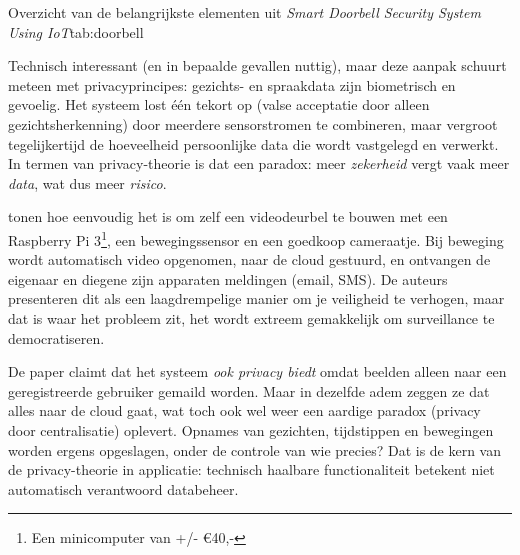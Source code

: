 \documentclass[nonacm, sigconf, balance=true]{acmart}
\begin{document}
    \begin{SimpleTable}[s{0.5}s{1.5}]{Overzicht van de belangrijkste elementen uit \textit{Smart Doorbell Security System Using IoT}}{tab:doorbell}
    \end{SimpleTable}

    Technisch interessant (en in bepaalde gevallen nuttig), maar deze aanpak schuurt meteen met privacyprincipes: gezichts- en spraakdata zijn biometrisch en gevoelig.
    Het systeem lost één tekort op (valse acceptatie door alleen gezichtsherkenning) door meerdere sensorstromen te combineren, maar vergroot tegelijkertijd de hoeveelheid persoonlijke data die wordt vastgelegd en verwerkt.
    In termen van privacy-theorie is dat een paradox: meer \emph{zekerheid} vergt vaak meer \emph{data}, wat dus meer \emph{risico}.

    \parencite{lalitha2019smart} tonen hoe eenvoudig het is om zelf een videodeurbel te bouwen met een Raspberry Pi 3\footnote{Een minicomputer van +/- €40,-}, een bewegingssensor en een goedkoop cameraatje.
    Bij beweging wordt automatisch video opgenomen, naar de cloud gestuurd, en ontvangen de eigenaar en diegene zijn apparaten meldingen (email, SMS).
    De auteurs presenteren dit als een laagdrempelige manier om je veiligheid te verhogen, maar dat is waar het probleem zit, het wordt extreem gemakkelijk om surveillance te democratiseren.

    De paper claimt dat het systeem \emph{ook privacy biedt} omdat beelden alleen naar een geregistreerde gebruiker gemaild worden.
    Maar in dezelfde adem zeggen ze dat alles naar de cloud gaat, wat toch ook wel weer een aardige paradox (privacy door centralisatie) oplevert.
    Opnames van gezichten, tijdstippen en bewegingen worden ergens opgeslagen, onder de controle van wie precies?
    Dat is de kern van de privacy-theorie in applicatie: technisch haalbare functionaliteit betekent niet automatisch verantwoord databeheer.
\end{document}
